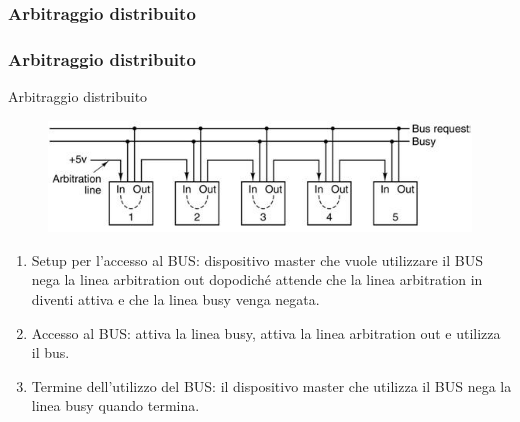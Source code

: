 \subsubsection[Arbitraggio distribuito]{Arbitraggio distribuito}
\begin{frame}
	\frametitle{Arbitraggio distribuito}
	  
	\begin{block}{Arbitraggio distribuito}
		\begin{figure}[!htbp]
			\centering
			\includegraphics[width=0.8\linewidth]{images/6_bus/daisy_chaining_distributed.jpg}
		\end{figure}
		
		\begin{footnotesize}
		\begin{enumerate}
			\item Setup per l'accesso al BUS: dispositivo master che vuole utilizzare il BUS nega la linea arbitration out dopodiché attende che la linea arbitration in diventi attiva e che la linea busy venga negata.
			\item Accesso al BUS: attiva la linea busy, attiva la linea arbitration out e utilizza il bus.
			\item Termine dell'utilizzo del BUS: il dispositivo master che utilizza il BUS nega la linea busy quando termina.
		\end{enumerate}
		\end{footnotesize}
		
	\end{block}
\end{frame}









